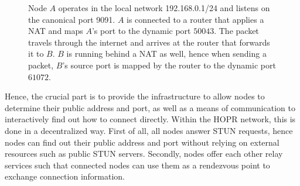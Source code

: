 \begin{figure}[H]
    \label{fig:successful-nat-traversal}
    \caption{Node $A$ operates in the local network 192.168.0.1/24 and listens on the canonical port 9091. $A$ is connected to a router that applies a NAT and maps $A$'s port to the dynamic port $50043$. The packet travels through the internet and arrives at the router that forwards it to $B$. $B$ is running behind a NAT as well, hence when sending a packet, $B$'s source port is mapped by the router to the dynamic port $61072$.}
\end{figure}

Hence, the crucial part is to provide the infrastructure to allow nodes to determine their public address and port, as well as a means of communication to interactively find out how to connect directly. Within the HOPR network, this is done in a decentralized way. First of all, all nodes answer STUN requests, hence nodes can find out their public address and port without relying on external resources such as public STUN servers. Secondly, nodes offer each other relay services such that connected nodes can use them as a rendezvous point to exchange connection information.

